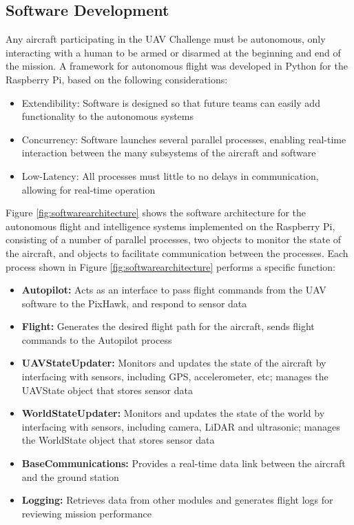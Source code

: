 \subsection{Software Development}
Any aircraft participating in the UAV Challenge must be autonomous, only interacting with a human to be armed or disarmed at the beginning and end of the mission. A framework for autonomous flight was developed in Python for the Raspberry Pi, based on the following considerations:
\begin{itemize}
	\item Extendibility: Software is designed so that future teams can easily add functionality to the autonomous systems
	\item Concurrency: Software launches several parallel processes, enabling real-time interaction between the many subsystems of the aircraft and software
	\item Low-Latency: All processes must little to no delays in communication, allowing for real-time operation 
\end{itemize}

Figure \ref{fig:softwarearchitecture} shows the software architecture for the autonomous flight and intelligence systems implemented on the Raspberry Pi, consisting of a number of parallel processes, two objects to monitor the state of the aircraft, and objects to facilitate communication between the processes. Each process shown in Figure \ref{fig:softwarearchitecture} performs a specific function:
\begin{itemize}
	\item \textbf{Autopilot:} Acts as an interface to pass flight commands from the UAV software to the PixHawk, and respond to sensor data
	\item \textbf{Flight:} Generates the desired flight path for the aircraft, sends flight commands to the Autopilot process
	\item \textbf{UAVStateUpdater:} Monitors and updates the state of the aircraft by interfacing with sensors, including GPS, accelerometer, etc; manages the UAVState object that stores sensor data
	\item \textbf{WorldStateUpdater:} Monitors and updates the state of the world by interfacing with sensors, including camera, LiDAR and ultrasonic; manages the WorldState object that stores sensor data
	\item \textbf{BaseCommunications:} Provides a real-time data link between the aircraft and the ground station
	\item \textbf{Logging:} Retrieves data from other modules and generates flight logs for reviewing mission performance
\end{itemize}

